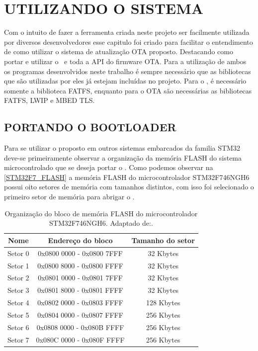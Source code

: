 
\chapter{UTILIZANDO O SISTEMA}
Com o intuito de fazer a ferramenta criada neste projeto ser facilmente utilizada por diversos desenvolvedores esse capitulo foi criado para facilitar o entendimento de como utilizar o sistema de atualização OTA proposto. Destacando como portar e utilizar o \bootloader\ e toda a API do firmware OTA. Para a utilização de ambos os programas desenvolvidos neste trabalho é sempre necessário que as bibliotecas que são utilizadas por eles já estejam incluídas no projeto. Para o \bootloader, é necessário somente a biblioteca FATFS, enquanto para o OTA são necessárias as bibliotecas FATFS, LWIP e MBED TLS.

\section{PORTANDO O BOOTLOADER}
Para se utilizar o \bootloader proposto em outros sistemas embarcados da familia STM32 deve-se primeiramente observar a organização da memória FLASH do sistema microcontrolado que se deseja portar o \bootloader. Como podemos observar na \autoref{STM32F7_FLASH} a memória FLASH do microcontrolador STM32F746NGH6 possui oito setores de memória com tamanhos distintos, com isso foi selecionado o primeiro setor de memória para abrigar o \bootloader.

\begin{table}[H]
    \scriptsize
    \centering
    \begin{tabular}{|c|c|c|}

    \hline
    Nome    & Endereço do bloco         & Tamanho do setor \\ \hline
    Setor 0 & 0x0800 0000 - 0x0800 7FFF & 32 Kbytes        \\ \hline
    Setor 1 & 0x0800 8000 - 0x0800 FFFF & 32 Kbytes        \\ \hline
    Setor 2 & 0x0801 0000 - 0x0801 7FFF & 32 Kbytes        \\ \hline
    Setor 3 & 0x0801 8000 - 0x0801 FFFF & 32 Kbytes        \\ \hline
    Setor 4 & 0x0802 0000 - 0x0803 FFFF & 128 Kbytes       \\ \hline
    Setor 5 & 0x0804 0000 - 0x0807 FFFF & 256 Kbytes       \\ \hline
    Setor 6 & 0x0808 0000 - 0x080B FFFF & 256 Kbytes       \\ \hline
    Setor 7 & 0x080C 0000 - 0x080F FFFF & 256 Kbytes       \\ \hline
    \end{tabular}
    \caption{Organização do bloco de memória FLASH do microcontrolador STM32F746NGH6. \newline Adaptado de:\cite{STM32F7}.}
    \label{STM32F7_FLASH}
    \end{table}


